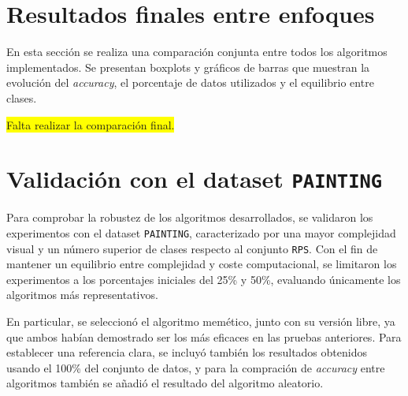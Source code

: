\section{Resultados finales entre enfoques}\label{sec:comparacion-final-enfoques}
En esta sección se realiza una comparación conjunta entre todos los algoritmos implementados.
Se presentan boxplots y gráficos de barras que muestran la evolución del \textit{accuracy}, el porcentaje de datos utilizados y el equilibrio entre clases.


\colorbox{yellow}{Falta realizar la comparación final.}


\section{Validación con el dataset \texttt{PAINTING}}\label{sec:validacion-con-painting}
Para comprobar la robustez de los algoritmos desarrollados, se validaron los experimentos con el dataset \texttt{PAINTING},
caracterizado por una mayor complejidad visual y un número superior de clases respecto al conjunto \texttt{RPS}.
Con el fin de mantener un equilibrio entre complejidad y coste computacional, se limitaron los experimentos a los porcentajes iniciales del 25\% y 50\%,
evaluando únicamente los algoritmos más representativos.

En particular, se seleccionó el algoritmo memético, junto con su versión libre, ya que ambos habían demostrado ser los más eficaces en las pruebas anteriores.
Para establecer una referencia clara, se incluyó también los resultados obtenidos usando el 100\% del conjunto de datos, y para la compración de
\textit{accuracy} entre algoritmos también se añadió el resultado del algoritmo aleatorio.

